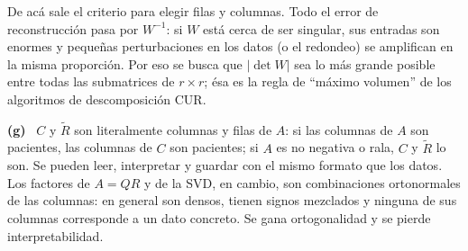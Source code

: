 \documentclass[11pt,a4paper]{article}
\newcommand{\itemsol}[1]{\par\medskip\noindent\textbf{(#1)}\ \ignorespaces}
\begin{document}
De acá sale el criterio para elegir filas y columnas. Todo el error de
reconstrucción pasa por $W^{-1}$: si $W$ está cerca de ser singular, sus
entradas son enormes y pequeñas perturbaciones en los datos (o el redondeo) se
amplifican en la misma proporción. Por eso se busca que $|\det W|$ sea lo más
grande posible entre todas las submatrices de $r\times r$; ésa es la regla de
``máximo volumen'' de los algoritmos de descomposición CUR.

\itemsol{g} $C$ y $\widetilde R$ son literalmente columnas y filas de $A$: si
las columnas de $A$ son pacientes, las columnas de $C$ son pacientes; si $A$ es
no negativa o rala, $C$ y $\widetilde R$ lo son. Se pueden leer, interpretar y
guardar con el mismo formato que los datos. Los factores de $A=QR$ y de la SVD,
en cambio, son combinaciones ortonormales de las columnas: en general son
densos, tienen signos mezclados y ninguna de sus columnas corresponde a un dato
concreto. Se gana ortogonalidad y se pierde interpretabilidad.
\end{document}
